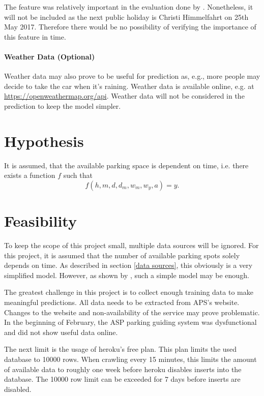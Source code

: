 \documentclass[journal,10pt]{IEEEtran}
\newcommand{\hod}{h}
\newcommand{\moh}{m}
\newcommand{\dow}{d}
\newcommand{\dom}{d_m}
\newcommand{\wom}{w_m}
\newcommand{\woy}{w_y}
\newcommand{\yyy}{a}
\begin{document}
The feature was relatively important in the evaluation done by \cite{parkendd}. Nonetheless, it will not be included as the next public holiday is Christi Himmelfahrt on 25th May 2017. Therefore there would be no possibility of verifying the importance of this feature in time.

\paragraph{Weather Data (Optional)}

Weather data may also prove to be useful for prediction as, e.g., more people may decide to take the car when it's raining. Weather data is available online, e.g. at \url{https://openweathermap.org/api}. Weather data will not be considered in the prediction to keep the model simpler.


\section{Hypothesis}

It is assumed, that the available parking space is dependent on time, i.e. there exists a function \(f\) such that 
\[
f(\hod, \moh, \dow, \dom, \wom, \woy, \yyy) = y\text{.}
\]



\section{Feasibility}

To keep the scope of this project small, multiple data sources will be ignored. For this project, it is assumed that the number of available parking spots solely depends on time. As described in section \ref{data sources}, this obviously is a very simplified model. However, as shown by \cite{parkendd}, such a simple model may be enough. 

The greatest challenge in this project is to collect enough training data to make meaningful predictions. All data needs to be extracted from APS's website. Changes to the website and non-availability of the service may prove problematic. In the beginning of February, the ASP parking guiding system was dysfunctional and did not show useful data online. 

The next limit is the usage of heroku's free plan. This plan limits the used database to 10000 rows. When crawling every 15 minutes, this limits the amount of available data to roughly one week before heroku disables inserts into the database. The 10000 row limit can be exceeded for 7 days before inserts are disabled.
\end{document}
